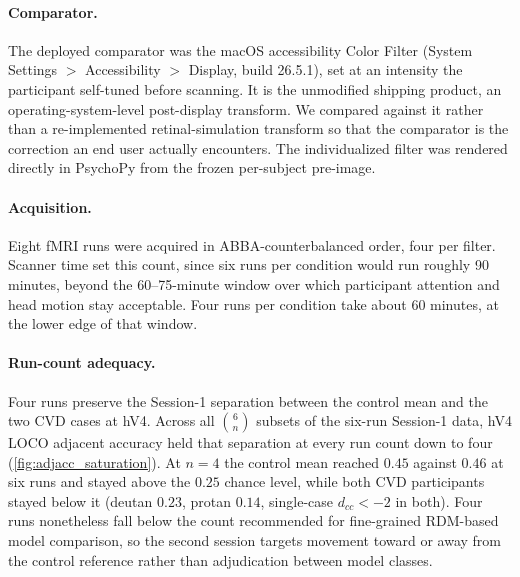 
\paragraph{Comparator.}
The deployed comparator was the macOS accessibility Color Filter (System Settings $>$ Accessibility $>$ Display, build 26.5.1), set at an intensity the participant self-tuned before scanning. It is the unmodified shipping product, an operating-system-level post-display transform. We compared against it rather than a re-implemented retinal-simulation transform so that the comparator is the correction an end user actually encounters. The individualized filter was rendered directly in PsychoPy from the frozen per-subject pre-image.

\paragraph{Acquisition.}
Eight fMRI runs were acquired in ABBA-counterbalanced order, four per filter. Scanner time set this count, since six runs per condition would run roughly 90 minutes, beyond the 60--75-minute window over which participant attention and head motion stay acceptable. Four runs per condition take about 60 minutes, at the lower edge of that window.

\paragraph{Run-count adequacy.}
Four runs preserve the Session-1 separation between the control mean and the two CVD cases at hV4. Across all $\binom{6}{n}$ subsets of the six-run Session-1 data, hV4 LOCO adjacent accuracy held that separation at every run count down to four (\cref{fig:adjacc_saturation}). At $n = 4$ the control mean reached $0.45$ against $0.46$ at six runs and stayed above the $0.25$ chance level, while both CVD participants stayed below it (deutan $0.23$, protan $0.14$, single-case $d_{cc} < -2$ in both). Four runs nonetheless fall below the count recommended for fine-grained RDM-based model comparison, so the second session targets movement toward or away from the control reference rather than adjudication between model classes.

